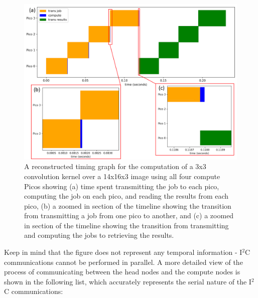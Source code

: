 \documentclass[conference]{IEEEtran}
\begin{document}
\begin{figure}[ht]
\includegraphics[width=\textwidth]{timeline_modified.png}
\caption{A reconstructed timing graph for the computation of a 3x3 convolution kernel over a 14x16x3 image using all four compute Picos showing (a) time spent transmitting the job to each pico, computing the job on each pico, and reading the results from each pico, (b) a zoomed in section of the timeline showing the transition from transmitting a job from one pico to another, and (c) a zoomed in section of the timeline showing the transition from transmitting and computing the jobs to retrieving the results.}
\label{timeline_plot}
\end{figure}

Keep in mind that the figure does not represent any temporal information - I$^2$C communications cannot be performed in parallel. A more detailed view of the process of communicating between the head nodes and the compute nodes is shown in the following list, which accurately represents the serial nature of the I$^2$C communications:
\end{document}
